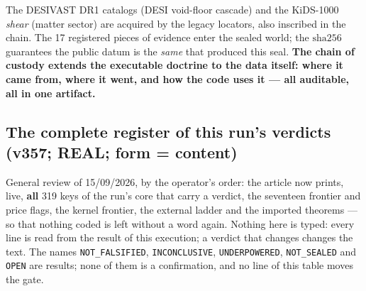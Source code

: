 \documentclass[11pt]{article}
\theoremstyle{definition}\newtheorem{deriv}{Derivation}
\begin{document}
The DESIVAST DR1 catalogs (DESI void-floor cascade) and the KiDS-1000 \emph{shear} (matter sector) are acquired by the legacy locators, also inscribed in the chain. The 17 registered pieces of evidence enter the sealed world; the $\mathrm{sha}256$ guarantees the public datum is the \emph{same} that produced this seal. \textbf{The chain of custody extends the executable doctrine to the data itself: where it came from, where it went, and how the code uses it --- all auditable, all in one artifact.}

\subsection*{The complete register of this run's verdicts (v357; REAL; form = content)}

General review of 15/09/2026, by the operator's order: the article now prints, live, \textbf{all} 319 keys of the run's core that carry a verdict, the seventeen frontier and price flags, the kernel frontier, the external ladder and the imported theorems --- so that nothing coded is left without a word again. Nothing here is typed: every line is read from the result of this execution; a verdict that changes changes the text. The names \texttt{NOT\_FALSIFIED}, \texttt{INCONCLUSIVE}, \texttt{UNDERPOWERED}, \texttt{NOT\_SEALED} and \texttt{OPEN} are results; none of them is a confirmation, and no line of this table moves the gate.
\end{document}
